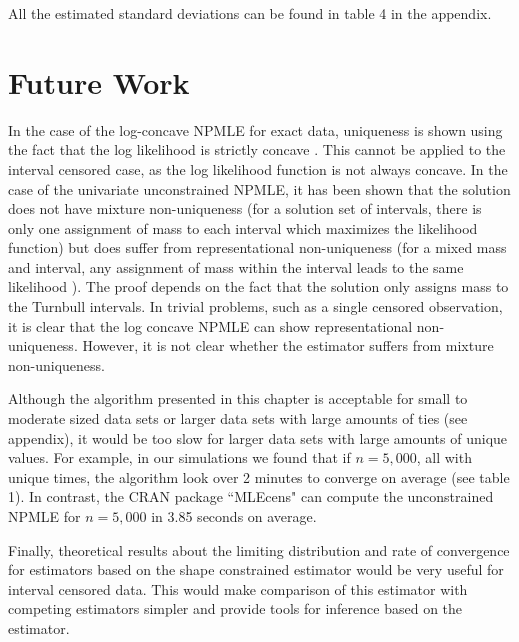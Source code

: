 	All the estimated standard deviations can be found in table 4 in the appendix.


	{\section{Future Work} } 
	\label{sec:9}
	In the case of the log-concave NPMLE for exact data, uniqueness is shown using the fact that the log likelihood is strictly concave \cite{RefRuf2007}. This cannot be applied to the interval censored case, as the log likelihood function is not always concave. In the case of the univariate unconstrained NPMLE, it has been shown that the solution does not have mixture non-uniqueness (for a solution set of intervals, there is only one assignment of mass to each interval which maximizes the likelihood function) but does suffer from representational non-uniqueness (for a mixed mass and interval, any assignment of mass within the interval leads to the same likelihood \cite{RefGV2001}). The proof depends on the fact that the solution only assigns mass to the Turnbull intervals. In trivial problems, such as a single censored observation, it is clear that the log concave NPMLE can show representational non-uniqueness. However, it is not clear whether the estimator suffers from mixture non-uniqueness. 
	
	Although the algorithm presented in this chapter is acceptable for small to moderate sized data sets or larger data sets with large amounts of ties (see appendix), it would be too slow for larger data sets with large amounts of unique values. For example, in our simulations we found that if $n = 5,000$, all with unique times, the algorithm look over 2 minutes to converge on average (see table 1). In contrast, the CRAN package ``MLEcens" can compute the unconstrained NPMLE for $ n = 5,000$ in 3.85 seconds on average. 
	
	Finally, theoretical results about the limiting distribution and rate of convergence for estimators based on the shape constrained estimator would be very useful for interval censored data. This would make comparison of this estimator with competing estimators simpler and provide tools for inference based on the estimator. 
			

